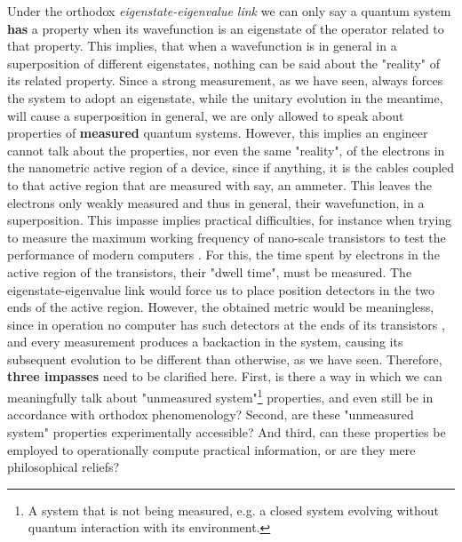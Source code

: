 \documentclass[11pt, a4paper]{article} %
\begin{document}
Under the orthodox {\em eigenstate-eigenvalue link} we can only say a quantum system {\bf has} a property when its wavefunction is an eigenstate of the operator related to that property. This implies, that when a wavefunction is in general in a superposition of different eigenstates, nothing can be said about the "reality" of its related property. Since a strong measurement, as we have seen, always forces the system to adopt an eigenstate, while the unitary evolution in the meantime, will cause a superposition in general, we are only allowed to speak about properties of {\bf measured} quantum systems. However, this implies an engineer cannot talk about the properties, nor even the same "reality", of the electrons in the nanometric active region of a device, since if anything, it is the cables coupled to that active region that are measured with say, an ammeter. This leaves the electrons only weakly measured and thus in general, their wavefunction, in a superposition. This impasse implies practical difficulties, for instance when trying to measure the maximum working frequency of nano-scale transistors to test the performance of modern computers \cite{modern}. For this, the time spent by electrons in the active region of the transistors, their "dwell time", must be measured. The eigenstate-eigenvalue link would force us to place position detectors in the two ends of the active region. However, the obtained metric would be meaningless, since in operation no computer has such detectors at the ends of its transistors \cite{tunnel1, tunnel2}, and every measurement produces a backaction in the system, causing its subsequent evolution to be different than otherwise, as we have seen. Therefore, {\bf three impasses} need to be clarified here. First, is there a way in which we can meaningfully talk about "unmeasured system"\footnote{A system that is not being measured, e.g. a closed system evolving without quantum interaction with its environment.} properties, and even still be in accordance with orthodox phenomenology? Second, are these "unmeasured system" properties experimentally accessible? And third, can these properties be employed to operationally compute practical information, or are they mere philosophical reliefs?
\end{document}
